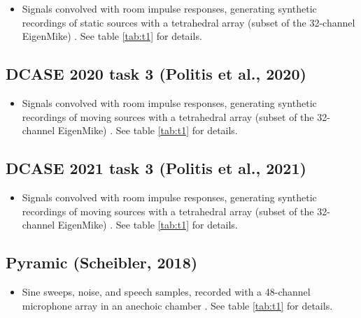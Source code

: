 \documentclass[14pt, legalpaper]{extarticle}
\begin{document}
\begin{itemize}

\item Signals convolved with room impulse responses, generating synthetic recordings of static sources with a tetrahedral array (subset of the 32-channel EigenMike) \cite{adavanne2019multi}. See table \ref{tab:t1} for details.

\end{itemize}

\subsection{DCASE 2020 task 3 (Politis et al., 2020)}

\begin{itemize}

\item Signals convolved with room impulse responses, generating synthetic recordings of moving sources with a tetrahedral array (subset of the 32-channel EigenMike) \cite{politis2020dataset}. See table \ref{tab:t1} for details.

\end{itemize}

\subsection{DCASE 2021 task 3 (Politis et al., 2021)}

\begin{itemize}

\item Signals convolved with room impulse responses, generating synthetic recordings of moving sources with a tetrahedral array (subset of the 32-channel EigenMike) \cite{politis2021tau}. See table \ref{tab:t1} for details.

\end{itemize}

\subsection{Pyramic (Scheibler, 2018)}

\begin{itemize}

\item Sine sweeps, noise, and speech samples, recorded with a 48-channel microphone array in an anechoic chamber \cite{scheibler2018pyramic}. See table \ref{tab:t1} for details.

\end{itemize}
\end{document}

